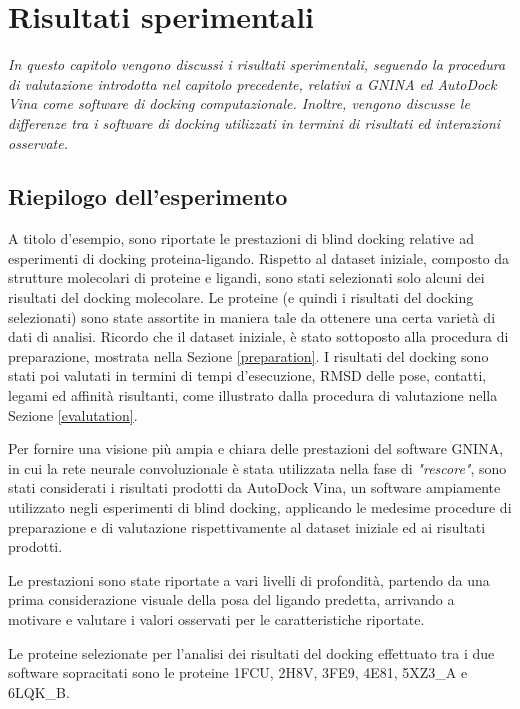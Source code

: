 \chapter{Risultati sperimentali}
\vskip 1cm

\textit{In questo capitolo vengono discussi i risultati sperimentali, seguendo la procedura di valutazione introdotta nel capitolo precedente, relativi a GNINA ed AutoDock Vina come software di docking computazionale. Inoltre, vengono discusse le differenze tra i software di docking utilizzati in termini di risultati ed interazioni osservate. }

\vskip 1cm
\section{Riepilogo dell'esperimento}
A titolo d'esempio, sono riportate le prestazioni di blind docking relative ad esperimenti di docking proteina-ligando. Rispetto al dataset iniziale, composto da strutture molecolari di proteine e ligandi, sono stati selezionati solo alcuni dei risultati del docking molecolare. 
Le proteine (e quindi i risultati del docking selezionati) sono state assortite in maniera tale da ottenere una certa varietà di dati di analisi. Ricordo che il dataset iniziale, è stato sottoposto alla procedura di preparazione, mostrata nella Sezione \ref{preparation}.
I risultati del docking sono stati poi valutati in termini di tempi d'esecuzione, RMSD delle pose, contatti, legami ed affinità risultanti, come illustrato dalla procedura di valutazione nella Sezione \ref{evalutation}.

Per fornire una visione più ampia e chiara delle prestazioni del software GNINA, in cui la rete neurale convoluzionale è stata utilizzata nella fase di \textit{"rescore"}, sono stati considerati i risultati prodotti da AutoDock Vina, un software ampiamente utilizzato negli esperimenti di blind docking, applicando le medesime procedure di preparazione e di valutazione rispettivamente al dataset iniziale ed ai risultati prodotti. 

Le prestazioni sono state riportate a vari livelli di profondità, partendo da una prima considerazione visuale della posa del ligando predetta, arrivando a motivare e valutare i valori osservati per le caratteristiche riportate. 

Le proteine selezionate per l'analisi dei risultati del docking effettuato tra i due software sopracitati sono le proteine 1FCU, 2H8V, 3FE9, 4E81, 5XZ3\_A e 6LQK\_B.


